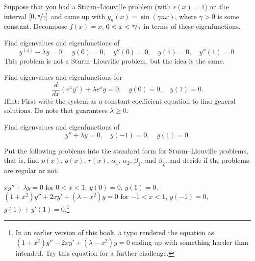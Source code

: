 \begin{exercise}
Suppose that you had a Sturm--Liouville problem (with $r(x)=1$) on the interval
$[0,\nicefrac{\pi}{\gamma}]$ and came up with
$y_n(x) = \sin (\gamma n x)$, where $\gamma > 0$ is some constant.
Decompose $f(x) = x$, $0 < x < \nicefrac{\pi}{\gamma}$
in terms of these eigenfunctions.
\end{exercise}

\begin{exercise}
Find eigenvalues and eigenfunctions of
\begin{equation*}
y^{(4)}-\lambda y = 0, \quad y(0) = 0, \quad y''(0) = 0, \quad y(1) = 0, \quad
y''(1) = 0 .
\end{equation*}
This problem is not a Sturm--Liouville problem, but the idea is the same.
\end{exercise}

\begin{exercise}
Find eigenvalues and eigenfunctions for
\begin{equation*}
\frac{d}{dx} (e^x y') + \lambda e^x y = 0, \quad y(0) = 0, \quad y(1) = 0 .
\end{equation*}
Hint: First write the system as a constant-coefficient equation to find
general solutions.  Do note that  guarantees $\lambda \geq 0$.
\end{exercise}

\setcounter{exercise}{100}

\begin{exercise}
Find eigenvalues and eigenfunctions of
\begin{equation*}
y'' + \lambda y = 0, \quad y(-1) = 0, \quad y(1) = 0 .
\end{equation*}
\end{exercise}

\begin{exercise}
Put the following problems into the standard form for Sturm--Liouville
problems, that is, find $p(x)$, $q(x)$, $r(x)$,
$\alpha_1$,
$\alpha_2$,
$\beta_1$, and
$\beta_2$,
and decide if the problems are regular or not.
\begin{tasks}
\task $x y'' + \lambda y = 0$
\enspace for $0 < x < 1$,
\enspace $y(0) = 0$,
\enspace $y(1) = 0$.
\task
$(1+x^2) y'' + 2xy' + (\lambda-x^2) y = 0$
\enspace for $-1 < x < 1$,
\enspace $y(-1) = 0$,
\enspace $y(1)+y'(1) = 0$.\footnote{%
In an earlier version of this book, a typo rendered the equation
as $(1+x^2) y'' - 2xy' + (\lambda-x^2) y = 0$ ending up with something
harder than intended.  Try this equation for a further challenge.}
\end{tasks}
\end{exercise}

